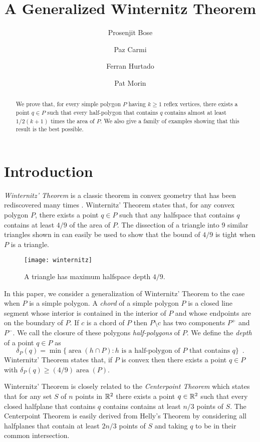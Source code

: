 \documentclass{article}
\title{A Generalized Winternitz Theorem}
\author{Prosenjit Bose \and 
	Paz Carmi \and
	Ferran Hurtado \and
	Pat Morin}
\DeclareMathOperator{\area}{area}
\begin{document}
\maketitle
\begin{abstract}
We prove that, for every simple polygon $P$ having $k\ge 1$ reflex
vertices, there exists a point $q\in P$ such that every half-polygon
that contains $q$ contains almost at least $1/2(k+1)$ times the area
of $P$.  We also give a family of examples showing that this result is
the best possible.
\end{abstract}

\section{Introduction}

\emph{Winternitz' Theorem} \cite[pp.~54--55]{b23} is a classic theorem
in convex geometry that has been rediscovered many times
\cite{e55b,ll35,n45,n58,yb51}.  Winternitz' Theorem states that, for
any convex polygon $P$, there exists a point $q\in P$ such that any
halfspace that contains $q$ contains at least $4/9$ of the area of
$P$.  The dissection of a triangle into 9 similar triangles shown in
 can easily be used to show that the bound of $4/9$
is tight when $P$ is a triangle.

\begin{figure}
  \begin{center}
    \texttt{[image: winternitz]}
  \end{center}
  \caption{A triangle has maximum halfspace depth $4/9$.}
\end{figure}


In this paper, we consider a generalization of Winternitz' Theorem to
the case when $P$ is a simple polygon.  A \emph{chord} of a simple
polygon $P$ is a closed line segment whose interior is contained in
the interior of $P$ and whose endpoints are on the boundary of $P$.
If $c$ is a chord of $P$ then $P\setminus c$ has two components $P^+$
and $P^-$.  We call the closure of these polygons \emph{half-polygons}
of $P$.  We define the \emph{depth} of a point $q\in P$ as 
\[
     \delta_P(q) = \min\{\area(h\cap P) : \mbox{$h$ is a half-polygon
	of $P$ that contains $q$} \} \enspace .
\]
Winternitz' Theorem states that, if $P$ is convex then there exists a
point $q\in P$ with $\delta_P(q)\ge (4/9)\area(P)$.  

Winternitz' Theorem is closely related to the \emph{Centerpoint
Theorem} \cite{pa95,m02} which states that for any set $S$ of $n$
points in $\mathbb{R}^2$ there exists a point $q\in\mathbb{R}^2$ such that every
closed halfplane that contains $q$ contains contains at least $n/3$
points of $S$.  The Centerpoint Theorem is easily derived from Helly's
Theorem \cite{e93} by considering all halfplanes that contain at least
$2n/3$ points of $S$ and taking $q$ to be in their common
intersection.
\end{document}
